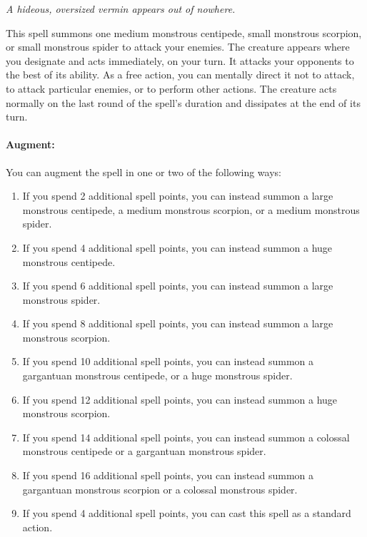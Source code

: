 \emph{A hideous, oversized vermin appears out of nowhere.}

This spell summons one medium monstrous centipede, small monstrous scorpion, or small monstrous spider to attack your enemies. 
The creature appears where you designate and acts immediately, on your turn. 
It attacks your opponents to the best of its ability. 
As a free action, you can mentally direct it not to attack, to attack particular enemies, or to perform other actions. 
The creature acts normally on the last round of the spell's duration and dissipates at the end of its turn.

\paragraph{Augment:} You can augment the spell in one or two of the following ways: 
\begin{enumerate}
 \item If you spend 2 additional spell points, you can instead summon a large monstrous centipede, a medium monstrous scorpion, or a medium monstrous spider.
 \item If you spend 4 additional spell points, you can instead summon a huge monstrous centipede.
 \item If you spend 6 additional spell points, you can instead summon a large monstrous spider.
 \item If you spend 8 additional spell points, you can instead summon a large monstrous scorpion.
 \item If you spend 10 additional spell points, you can instead summon a gargantuan monstrous centipede, or a huge monstrous spider.
 \item If you spend 12 additional spell points, you can instead summon a huge monstrous scorpion.
 \item If you spend 14 additional spell points, you can instead summon a colossal monstrous centipede or a gargantuan monstrous spider.
 \item If you spend 16 additional spell points, you can instead summon a gargantuan monstrous scorpion or a colossal monstrous spider.
 \item If you spend 4 additional spell points, you can cast this spell as a standard action.
\end{enumerate}
